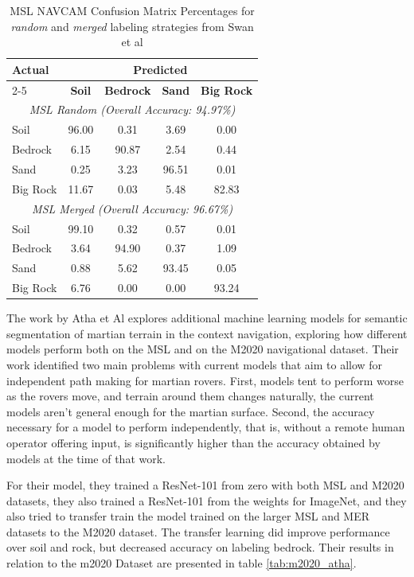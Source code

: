 \documentclass[10pt, conference]{IEEEtran}
\begin{document}
\begin{table}[h]
  \centering
  \label{tab:msl_confusion_matrices}
  \begin{tabular}{|l|c|c|c|c|}
    \hline
    \textbf{Actual} & \multicolumn{4}{c|}{\textbf{Predicted}} \\ \cline{2-5} 
                    & \textbf{Soil} & \textbf{Bedrock} & \textbf{Sand} & \textbf{Big Rock} \\ \hline
    \hline
    \multicolumn{5}{|c|}{\textit{MSL Random (Overall Accuracy: 94.97\%)}} \\ \hline
    Soil     & 96.00 & 0.31  & 3.69  & 0.00  \\ \hline
    Bedrock  & 6.15  & 90.87 & 2.54  & 0.44  \\ \hline
    Sand     & 0.25  & 3.23  & 96.51 & 0.01  \\ \hline
    Big Rock & 11.67 & 0.03  & 5.48  & 82.83 \\ \hline
    \hline
    \multicolumn{5}{|c|}{\textit{MSL Merged (Overall Accuracy: 96.67\%)}} \\ \hline
    Soil     & 99.10 & 0.32  & 0.57  & 0.01  \\ \hline
    Bedrock  & 3.64  & 94.90 & 0.37  & 1.09  \\ \hline
    Sand     & 0.88  & 5.62  & 93.45 & 0.05  \\ \hline
    Big Rock & 6.76  & 0.00  & 0.00  & 93.24 \\ \hline
  \end{tabular}
  \caption{MSL NAVCAM Confusion Matrix Percentages for \textit{random} and \textit{merged}
  labeling strategies from Swan et al \cite{Swan2021}}
  \label{tab:Swan2021_results}
\end{table}

The work by Atha et Al \cite{Atha2022} explores additional machine learning models for
semantic segmentation of martian terrain in the context navigation, exploring how
different models perform both on the MSL and on the M2020 navigational dataset. Their work
identified two main problems with current models that aim to allow for independent path
making for martian rovers. First, models tent to perform worse as the rovers move, and terrain
around them changes naturally, the current models aren't general enough for the martian surface.
Second, the accuracy necessary for a model to perform independently, that is, without a remote human
operator offering input, is significantly higher than the accuracy obtained by models at the time of
that work.

For their model, they trained a ResNet-101 from zero with both MSL and M2020 datasets, they also
trained a ResNet-101 from the weights for ImageNet, and they also tried to transfer train the model
trained on the larger MSL and MER datasets to the M2020 dataset. The transfer learning did improve
performance over soil and rock, but decreased accuracy on labeling bedrock. Their results in
relation to the m2020 Dataset are presented in table \ref{tab:m2020_atha}.
\end{document}
